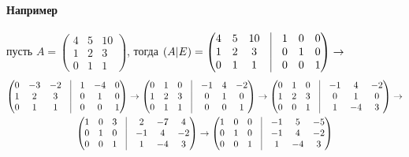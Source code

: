 \documentclass[class=article,a4paper,12pt,crop=false]{standalone}
\begin{document}
\paragraph{Например} пусть $A = \begin{pmatrix}
    4 & 5 & 10 \\ 1 & 2 & 3 \\ 0 & 1 & 1
\end{pmatrix}$, тогда $\left(A | E\right) = \begin{pmatrix}
    4 & 5 & 10 & \vrule & 1 & 0 & 0 \\
    1 & 2 & 3 & \vrule & 0 & 1 & 0 \\
    0 & 1 & 1 & \vrule & 0 & 0 & 1
\end{pmatrix} \rightarrow$
\begin{multline}
    \begin{pmatrix}
        0 & -3 & -2 & \vrule & 1 & -4 & 0 \\
        1 & 2 & 3 & \vrule & 0 & 1 & 0 \\
        0 & 1 & 1 & \vrule & 0 & 0 & 1
    \end{pmatrix} \rightarrow
    \begin{pmatrix}
        0 & 1 & 0 & \vrule & -1 & 4 & -2 \\
        1 & 2 & 3 & \vrule & 0 & 1 & 0 \\
        0 & 1 & 1 & \vrule & 0 & 0 & 1
    \end{pmatrix} \rightarrow
    \begin{pmatrix}
        0 & 1 & 0 & \vrule & -1 & 4 & -2 \\
        1 & 2 & 3 & \vrule & 0 & 1 & 0 \\
        0 & 0 & 1 & \vrule & 1 & -4 & 3
    \end{pmatrix} \rightarrow \\
    \begin{pmatrix}
        1 & 0 & 3 & \vrule & 2 & -7 & 4 \\
        0 & 1 & 0 & \vrule & -1 & 4 & -2 \\
        0 & 0 & 1 & \vrule & 1 & -4 & 3
    \end{pmatrix} \rightarrow
    \begin{pmatrix}
        1 & 0 & 0 & \vrule & -1 & 5 & -5 \\
        0 & 1 & 0 & \vrule & -1 & 4 & -2 \\
        0 & 0 & 1 & \vrule & 1 & -4 & 3
    \end{pmatrix} 
\end{multline}
\end{document}
